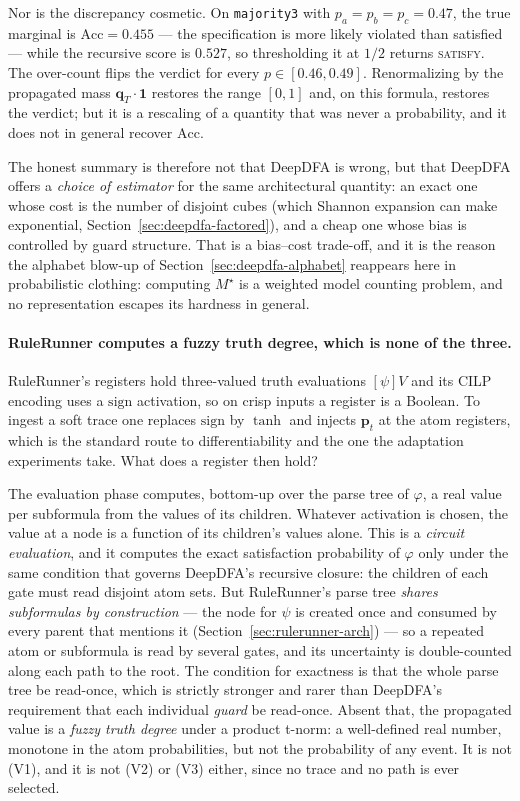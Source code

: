 Nor is the discrepancy cosmetic. On \texttt{majority3} with $p_a = p_b = p_c = 0.47$, the true marginal is $\mathrm{Acc} = 0.455$ --- the specification is more likely violated than satisfied --- while the recursive score is $0.527$, so thresholding it at $1/2$ returns \textsc{satisfy}. The over-count flips the verdict for every $p \in [0.46, 0.49]$. Renormalizing by the propagated mass $\mathbf{q}_T \cdot \mathbf{1}$ restores the range $[0,1]$ and, on this formula, restores the verdict; but it is a rescaling of a quantity that was never a probability, and it does not in general recover $\mathrm{Acc}$.

The honest summary is therefore not that DeepDFA is wrong, but that DeepDFA offers a \emph{choice of estimator} for the same architectural quantity: an exact one whose cost is the number of disjoint cubes (which Shannon expansion can make exponential, Section~\ref{sec:deepdfa-factored}), and a cheap one whose bias is controlled by guard structure. That is a bias--cost trade-off, and it is the reason the alphabet blow-up of Section~\ref{sec:deepdfa-alphabet} reappears here in probabilistic clothing: computing $M^\star$ is a weighted model counting problem, and no representation escapes its hardness in general.

\paragraph{RuleRunner computes a fuzzy truth degree, which is none of the three.} RuleRunner's registers hold three-valued truth evaluations $[\psi]V$ and its CILP encoding uses a $\mathrm{sign}$ activation, so on crisp inputs a register is a Boolean. To ingest a soft trace one replaces $\mathrm{sign}$ by $\tanh$ and injects $\mathbf{p}_t$ at the atom registers, which is the standard route to differentiability and the one the adaptation experiments take. What does a register then hold?

The evaluation phase computes, bottom-up over the parse tree of $\varphi$, a real value per subformula from the values of its children. Whatever activation is chosen, the value at a node is a function of its children's values alone. This is a \emph{circuit evaluation}, and it computes the exact satisfaction probability of $\varphi$ only under the same condition that governs DeepDFA's recursive closure: the children of each gate must read disjoint atom sets. But RuleRunner's parse tree \emph{shares subformulas by construction} --- the node for $\psi$ is created once and consumed by every parent that mentions it (Section~\ref{sec:rulerunner-arch}) --- so a repeated atom or subformula is read by several gates, and its uncertainty is double-counted along each path to the root. The condition for exactness is that the whole parse tree be read-once, which is strictly stronger and rarer than DeepDFA's requirement that each individual \emph{guard} be read-once. Absent that, the propagated value is a \emph{fuzzy truth degree} under a product t-norm: a well-defined real number, monotone in the atom probabilities, but not the probability of any event. It is not (V1), and it is not (V2) or (V3) either, since no trace and no path is ever selected.

